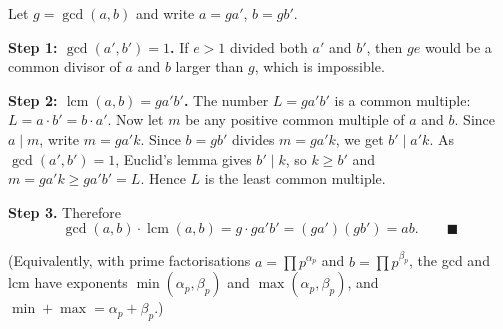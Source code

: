 Let $g=\gcd(a,b)$ and write $a=ga'$, $b=gb'$.

\textbf{Step 1: $\gcd(a',b')=1$.} If $e>1$ divided both $a'$ and $b'$, then $ge$ would be a common divisor of $a$ and $b$ larger than $g$, which is impossible.

\textbf{Step 2: $\operatorname{lcm}(a,b)=ga'b'$.} The number $L=ga'b'$ is a common multiple: $L=a\cdot b'=b\cdot a'$. Now let $m$ be any positive common multiple of $a$ and $b$. Since $a\mid m$, write $m=ga'k$. Since $b=gb'$ divides $m=ga'k$, we get $b'\mid a'k$. As $\gcd(a',b')=1$, Euclid's lemma gives $b'\mid k$, so $k\ge b'$ and $m=ga'k\ge ga'b'=L$. Hence $L$ is the least common multiple.

\textbf{Step 3.} Therefore
\[\gcd(a,b)\cdot\operatorname{lcm}(a,b)=g\cdot ga'b'=(ga')(gb')=ab.\qquad\blacksquare\]

(Equivalently, with prime factorisations $a=\prod p^{\alpha_p}$ and $b=\prod p^{\beta_p}$, the gcd and lcm have exponents $\min(\alpha_p,\beta_p)$ and $\max(\alpha_p,\beta_p)$, and $\min+\max=\alpha_p+\beta_p$.)
